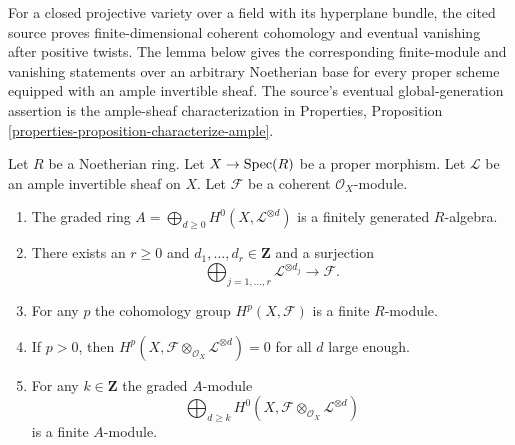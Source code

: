 \begin{lemma}
\label{lemma-coherent-proper-ample}
\begin{reference}
\cite[Chapter III, \S 3, no. 66, Theorems 1 and 2,
pp. 259--260]{FAC}
\end{reference}
\begin{history}
For a closed projective variety over a field with its hyperplane bundle, the
cited source proves finite-dimensional coherent cohomology and eventual
vanishing after positive twists. The lemma below gives the corresponding
finite-module and vanishing statements over an arbitrary Noetherian base for
every proper scheme equipped with an ample invertible sheaf. The source's
eventual global-generation assertion is the ample-sheaf characterization in
Properties, Proposition \ref{properties-proposition-characterize-ample}.
\end{history}
Let $R$ be a Noetherian ring. Let $X \to \mathop{\mathrm{Spec}}(R)$ be a proper morphism.
Let $\mathcal{L}$ be an ample invertible sheaf on $X$. Let $\mathcal{F}$
be a coherent $\mathcal{O}_X$-module.
\begin{enumerate}
\item The graded ring
$A = \bigoplus_{d \geq 0} H^0(X, \mathcal{L}^{\otimes d})$
is a finitely generated $R$-algebra.
\item There exists an $r \geq 0$ and
$d_1, \ldots, d_r \in \mathbf{Z}$ and a surjection
$$
\bigoplus\nolimits_{j = 1, \ldots, r} \mathcal{L}^{\otimes d_j}
\longrightarrow \mathcal{F}.
$$
\item For any $p$ the cohomology group $H^p(X, \mathcal{F})$ is a finite
$R$-module.
\item If $p > 0$, then
$H^p(X, \mathcal{F} \otimes_{\mathcal{O}_X} \mathcal{L}^{\otimes d}) = 0$
for all $d$ large enough.
\item For any $k \in \mathbf{Z}$ the graded $A$-module
$$
\bigoplus\nolimits_{d \geq k}
H^0(X, \mathcal{F} \otimes_{\mathcal{O}_X} \mathcal{L}^{\otimes d})
$$
is a finite $A$-module.
\end{enumerate}
\end{lemma}

